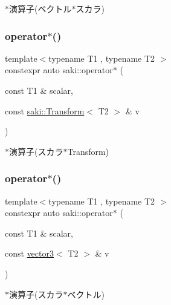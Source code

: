 $\ast$演算子(ベクトル$\ast$スカラ) 

\mbox{\label{namespacesaki_a58e8c0c0b829ce6f2da4895bef1f0512}} 
\subsubsection{\texorpdfstring{operator$\ast$()}{operator*()}\hspace{0.1cm}{\footnotesize\ttfamily [5/14]}}
{\footnotesize\ttfamily template$<$typename T1 , typename T2 $>$ \\
constexpr auto saki\+::operator$\ast$ (\begin{DoxyParamCaption}\item[{const T1 \&}]{scalar,  }\item[{const \mbox{\hyperlink{classsaki_1_1_transform}{saki\+::\+Transform}}$<$ T2 $>$ \&}]{v }\end{DoxyParamCaption})}



$\ast$演算子(スカラ$\ast$\+Transform) 

\mbox{\label{namespacesaki_ab3e41594237dcaac47a2a27ed97f48f6}} 
\subsubsection{\texorpdfstring{operator$\ast$()}{operator*()}\hspace{0.1cm}{\footnotesize\ttfamily [6/14]}}
{\footnotesize\ttfamily template$<$typename T1 , typename T2 $>$ \\
constexpr auto saki\+::operator$\ast$ (\begin{DoxyParamCaption}\item[{const T1 \&}]{scalar,  }\item[{const \mbox{\hyperlink{classsaki_1_1vector3}{vector3}}$<$ T2 $>$ \&}]{v }\end{DoxyParamCaption})}



$\ast$演算子(スカラ$\ast$ベクトル) 

\mbox{\label{namespacesaki_ad1caaaf5b1af879f2d546a4b2e10974e}} 
